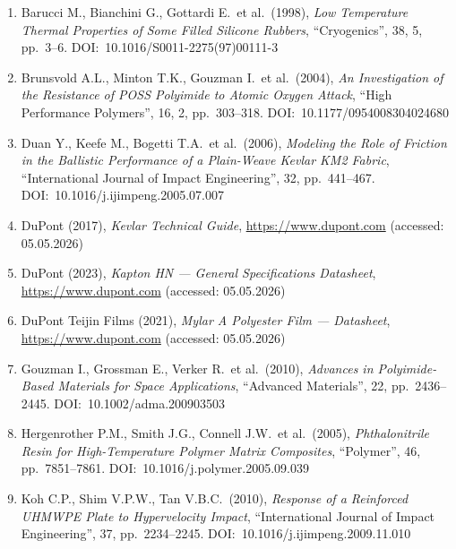 \documentclass[11pt,a4paper]{article}
\begin{document}
{\fontsize{9.5}{11.4}\selectfont
\begin{enumerate}[label=\arabic*., leftmargin=1.5cm, topsep=0pt,
                  itemsep=0pt, parsep=0pt]

  \item Barucci M., Bianchini G., Gottardi E.\ et al.\ (1998), \textit{Low
    Temperature Thermal Properties of Some Filled Silicone Rubbers},
    ``Cryogenics'', 38, 5, pp.\ 3--6. DOI:~10.1016/S0011-2275(97)00111-3

  \item Brunsvold A.L., Minton T.K., Gouzman I.\ et al.\ (2004), \textit{An
    Investigation of the Resistance of POSS Polyimide to Atomic Oxygen Attack},
    ``High Performance Polymers'', 16, 2, pp.\ 303--318.
    DOI:~10.1177/0954008304024680

  \item Duan Y., Keefe M., Bogetti T.A.\ et al.\ (2006), \textit{Modeling the
    Role of Friction in the Ballistic Performance of a Plain-Weave Kevlar KM2
    Fabric}, ``International Journal of Impact Engineering'', 32, pp.\ 441--467.
    DOI:~10.1016/j.ijimpeng.2005.07.007

  \item DuPont (2017), \textit{Kevlar Technical Guide}, \url{https://www.dupont.com}
    (accessed: 05.05.2026)

  \item DuPont (2023), \textit{Kapton HN — General Specifications Datasheet},
    \url{https://www.dupont.com} (accessed: 05.05.2026)

  \item DuPont Teijin Films (2021), \textit{Mylar A Polyester Film — Datasheet},
    \url{https://www.dupont.com} (accessed: 05.05.2026)

  \item Gouzman I., Grossman E., Verker R.\ et al.\ (2010), \textit{Advances in
    Polyimide-Based Materials for Space Applications}, ``Advanced Materials'',
    22, pp.\ 2436--2445. DOI:~10.1002/adma.200903503

  \item Hergenrother P.M., Smith J.G., Connell J.W.\ et al.\ (2005),
    \textit{Phthalonitrile Resin for High-Temperature Polymer Matrix Composites},
    ``Polymer'', 46, pp.\ 7851--7861. DOI:~10.1016/j.polymer.2005.09.039

  \item Koh C.P., Shim V.P.W., Tan V.B.C.\ (2010), \textit{Response of a
    Reinforced UHMWPE Plate to Hypervelocity Impact}, ``International Journal of
    Impact Engineering'', 37, pp.\ 2234--2245. DOI:~10.1016/j.ijimpeng.2009.11.010


\end{enumerate}}
\end{document}

